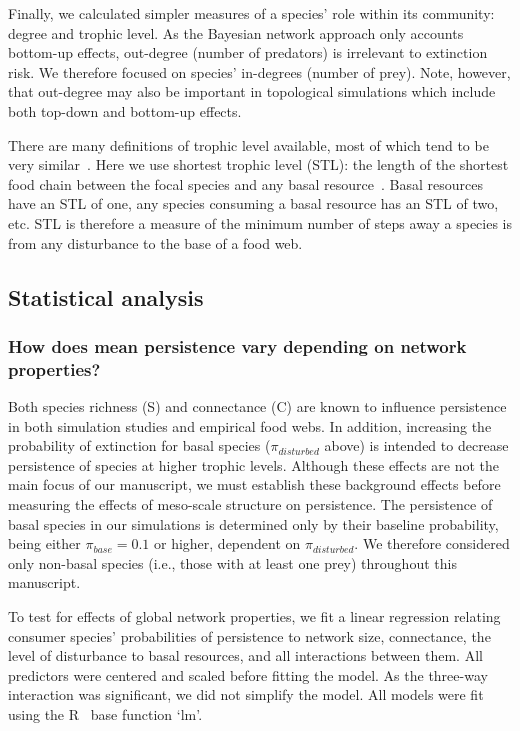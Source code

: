 \documentclass[12pt]{article}
\begin{document}
\begin{spacing}{2.0}
        
        Finally, we calculated simpler measures of a species' role within its community: degree and trophic level.
		As the Bayesian network approach only accounts  bottom-up effects, out-degree (number of predators) is irrelevant to extinction risk.
		We therefore focused on species' in-degrees (number of prey).
		Note, however, that out-degree may also be important in topological simulations which include both top-down and bottom-up effects. 


		There are many definitions of trophic level available, most of which tend to be very similar~\citep{Carscallen2012}.
		Here we use shortest trophic level (STL): the length of the shortest food chain between the focal species and any basal resource~\citep{Williams2004}. 
		Basal resources have an STL of one, any species consuming a basal resource has an STL of two, etc.
        STL is therefore a measure of the minimum number of steps away a species is from any disturbance to the base of a food web.


	\subsection*{Statistical analysis} 

        \subsubsection*{How does mean persistence vary depending on network properties?}
        
            Both species richness (S) and connectance (C) are known to influence persistence in both simulation studies and empirical food webs.
            In addition, increasing the probability of extinction for basal species ($\pi_{disturbed}$ above) is intended to decrease persistence of species at higher trophic levels.
            Although these effects are not the main focus of our manuscript, we must establish these background effects before measuring the effects of meso-scale structure on persistence.
            The persistence of basal species in our simulations is determined only by their baseline probability, being either $\pi_{base} = 0.1$ or higher, dependent on $\pi_{disturbed}$.
            We therefore considered only non-basal species (i.e., those with at least one prey) throughout this manuscript.

            To test for effects of global network properties, we fit a linear regression relating consumer species' probabilities of persistence to network size, connectance, the level of disturbance to basal resources, and all interactions between them. 
            All predictors were centered and scaled before fitting the model. 
            As the three-way interaction was significant, we did not simplify the model.
            All models were fit using the R~\citep{R} base function `lm'.


\end{spacing}
\end{document}
